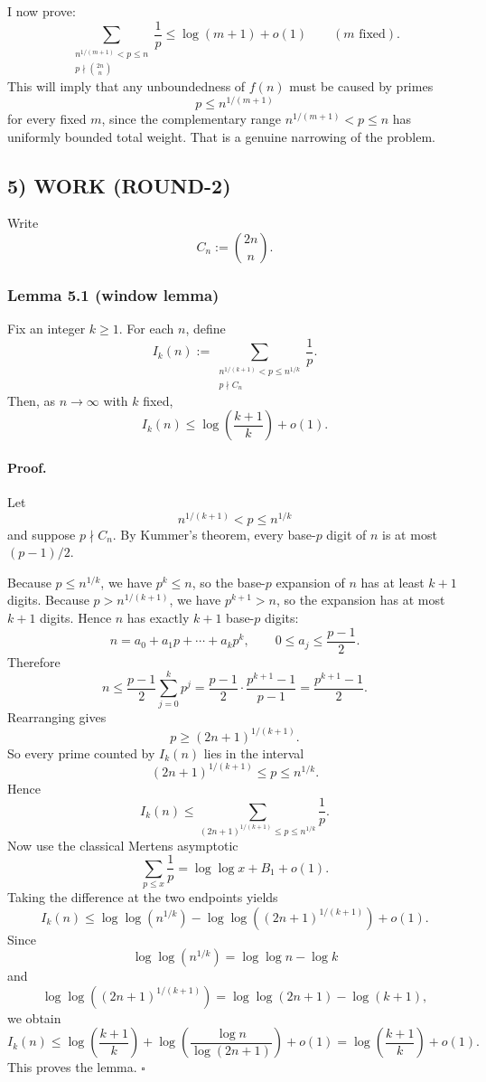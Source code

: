 I now prove:
\[
\sum_{\substack{n^{1/(m+1)}<p\le n\\ p\nmid \binom{2n}{n}}}\frac1p
\le \log(m+1)+o(1)
\qquad (m \text{ fixed}).
\]
This will imply that any unboundedness of $f(n)$ must be caused by primes
\[
p\le n^{1/(m+1)}
\]
for every fixed $m$, since the complementary range $n^{1/(m+1)}<p\le n$ has uniformly bounded total weight.
That is a genuine narrowing of the problem.

\subsection*{5) WORK (ROUND-2)}

Write
\[
C_n:=\binom{2n}{n}.
\]

\subsubsection*{Lemma 5.1 (window lemma)}
Fix an integer $k\ge 1$.
For each $n$, define
\[
I_k(n):=\sum_{\substack{n^{1/(k+1)}<p\le n^{1/k}\\ p\nmid C_n}}\frac1p.
\]
Then, as $n\to\infty$ with $k$ fixed,
\[
I_k(n)\le \log\!\left(\frac{k+1}{k}\right)+o(1).
\]

\paragraph{Proof.}
Let
\[
n^{1/(k+1)}<p\le n^{1/k}
\]
and suppose $p\nmid C_n$.
By Kummer's theorem, every base-$p$ digit of $n$ is at most $(p-1)/2$.

Because $p\le n^{1/k}$, we have $p^k\le n$, so the base-$p$ expansion of $n$ has at least $k+1$ digits.
Because $p>n^{1/(k+1)}$, we have $p^{k+1}>n$, so the expansion has at most $k+1$ digits.
Hence $n$ has exactly $k+1$ base-$p$ digits:
\[
n=a_0+a_1p+\cdots + a_kp^k,
\qquad
0\le a_j\le \frac{p-1}{2}.
\]
Therefore
\[
n\le \frac{p-1}{2}\sum_{j=0}^k p^j
 = \frac{p-1}{2}\cdot \frac{p^{k+1}-1}{p-1}
 = \frac{p^{k+1}-1}{2}.
\]
Rearranging gives
\[
p\ge (2n+1)^{1/(k+1)}.
\]
So every prime counted by $I_k(n)$ lies in the interval
\[
(2n+1)^{1/(k+1)}\le p\le n^{1/k}.
\]
Hence
\[
I_k(n)\le \sum_{(2n+1)^{1/(k+1)}\le p\le n^{1/k}}\frac1p.
\]
Now use the classical Mertens asymptotic
\[
\sum_{p\le x}\frac1p=\log\log x + B_1 + o(1).
\]
Taking the difference at the two endpoints yields
\[
I_k(n)\le
\log\log(n^{1/k})-\log\log((2n+1)^{1/(k+1)})+o(1).
\]
Since
\[
\log\log(n^{1/k})=\log\log n - \log k
\]
and
\[
\log\log((2n+1)^{1/(k+1)})
=
\log\log(2n+1)-\log(k+1),
\]
we obtain
\[
I_k(n)\le
\log\!\left(\frac{k+1}{k}\right)
+
\log\!\left(\frac{\log n}{\log(2n+1)}\right)
+o(1)
=
\log\!\left(\frac{k+1}{k}\right)+o(1).
\]
This proves the lemma. \hfill$\square$

